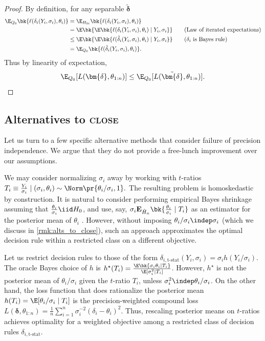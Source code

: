 \documentclass[12pt, reqno]{amsart}
\newcommand{\PE}{\mathbf{E}}
\newcommand{\close}{\textsc{close}}
\newcommand{\bdelta}{\bm{\delta}}
\numberwithin{equation}{section}
\begin{document}
\begin{refsection}
\begin{appendices}
\begin{proof}
By definition, for any separable $\tilde{\bdelta}$ \begin{align*}
\E_{Q_0}\bk{
  \ell(\delta_i(Y_i, \sigma_i), \theta_i)
} &= \E_{H_{0i}}\bk{
  \ell(\delta_i(Y_i, \sigma_i), \theta_i)
}  \\
&= \E\bk{
  \E\bk{\ell(\delta_i(Y_i, \sigma_i), \theta_i) \mid Y_i, \sigma_i}
}  \tag{Law of iterated expectations}\\
&\le \E\bk{
  \E\bk{\ell(\tilde\delta_i(Y_i, \sigma_i), \theta_i) \mid Y_i, \sigma_i}
} \tag{$\delta_i$ is Bayes rule} \\
&= \E_{Q_0}\bk{
  \ell(\tilde\delta_i(Y_i, \sigma_i), \theta_i)
}.
\end{align*}
Thus by linearity of expectation, \[
\E_{Q_0}[L(\bdelta, \theta_{1:n})] \le \E_{Q_0}[L(\tilde{\bdelta}, \theta_{1:n})].\qedhere
\]
\end{proof}

\subsection{Alternatives to \close}
\label{sub:alt_methods}


Let us turn to a few specific alternative methods that consider failure of precision
independence. We argue that they do not provide a free-lunch improvement over our
assumptions. 






\begin{altsq}
We may consider normalizing $\sigma_i$ away by working with
$t$-ratios $
T_i \equiv \frac{Y_i}{\sigma_i} \mid (\sigma_i, \theta_i) \sim \Norm
\pr{\theta_i/\sigma_i, 1}.$ The resulting problem is homoskedastic by construction. It is
natural to consider performing empirical Bayes shrinkage assuming that
$\frac{\theta_i}{\sigma_i} \iid H_0$, and use, say, $\sigma_i \PE_{\hat H_n}\bk{\frac
{\theta_i}{\sigma_i} \mid T_i}$ as an estimator for the posterior mean of $\theta_i$
\citep{jiang2010empirical}. However, without imposing $\theta_i/\sigma_i \indep
\sigma_i$ (which we discuss in \cref{rmk:alts_to_close}), such an approach approximates
the optimal decision rule within a restricted class on a different objective.

Let us restrict decision rules to those of the form $\delta_{i, \text{t-stat}}(Y_i,
\sigma_i) = \sigma_i h (Y_i/\sigma_i)$. The oracle Bayes choice of $h$ is $h^\star(T_i)
=\frac{\E\bk{\sigma_i \theta_i \mid T_i}}{
\E[\sigma_i^2 \mid T_i]}$. However, $h^\star$ is {not} the posterior mean of
$\theta_i/\sigma_i$ given the $t$-ratio $T_i$, unless $\sigma_i^2 \indep
\theta_i/\sigma_i$.
On the other hand, the loss function that does rationalize the posterior mean $h(T_i) =
\E[\theta_i/\sigma_i \mid T_i]$ is the precision-weighted compound loss $L(\bdelta,
\theta_{1:n}) = \frac{1}{n} \sum_{i=1}^n
\sigma_i^{-2} (\delta_i - \theta_i)^2$. Thus, rescaling posterior means on $t$-ratios
achieves optimality for a weighted objective among a restricted class of decision rules
$\delta_{i, \text{t-stat}}$.
\end{altsq}


\end{appendices}
\end{refsection}
\end{document}
